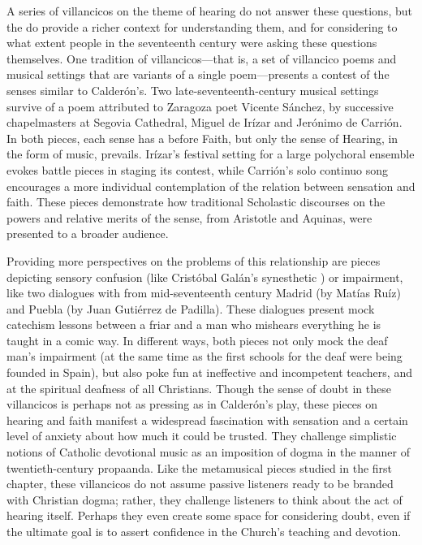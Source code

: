A series of villancicos on the theme of hearing do not answer these questions, but the do provide a richer context for understanding them, and for considering to what extent people in the seventeenth century were asking these questions themselves.
One tradition of villancicos---that is, a set of villancico poems and musical settings that are variants of a single poem---presents a contest of the senses similar to Calderón's.
Two late-seventeenth-century musical settings survive of a poem attributed to Zaragoza poet Vicente Sánchez, by successive chapelmasters at Segovia Cathedral, Miguel de Irízar and Jerónimo de Carrión.
In both pieces, each sense has a  before Faith, but only the sense of Hearing, in the form of music, prevails.
Irízar's festival setting for a large polychoral ensemble evokes battle pieces in staging its contest, while Carrión's solo continuo song encourages a more individual contemplation of the relation between sensation and faith. 
These pieces demonstrate how traditional Scholastic discourses on the powers and relative merits of the sense, from Aristotle and Aquinas, were presented to a broader audience.

Providing more perspectives on the problems of this relationship are pieces depicting sensory confusion (like Cristóbal Galán's\X{} synesthetic ) or impairment, like two dialogues with  from mid-seventeenth century Madrid (by Matías Ruíz) and Puebla (by Juan Gutiérrez de Padilla).
These dialogues present mock catechism lessons between a friar and a man who mishears everything he is taught in a comic way.
In different ways, both pieces not only mock the deaf man's impairment (at the same time as the first schools for the deaf were being founded in Spain), but also poke fun at ineffective and incompetent teachers, and at the spiritual deafness of all Christians.
Though the sense of doubt in these villancicos is perhaps not as pressing as in Calderón's play, these pieces on hearing and faith manifest a widespread fascination with sensation and a certain level of anxiety about how much it could be trusted.
They challenge simplistic notions of Catholic devotional music as an imposition of dogma in the manner of twentieth-century propaanda. 
Like the metamusical pieces studied in the first chapter, these villancicos do not assume passive listeners ready to be branded with Christian dogma; rather, they challenge listeners to think about the act of hearing itself.
Perhaps they even create some space for considering doubt, even if the ultimate goal is to assert confidence in the Church's teaching and devotion.
